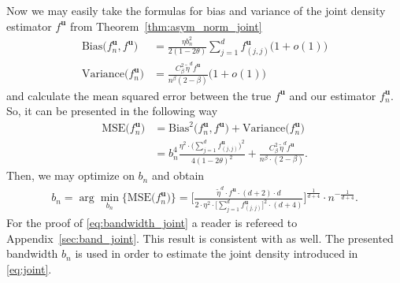 \documentclass[12pt]{article}
\begin{document}
	Now we may easily take the formulas for bias and variance of the joint density estimator $ f^{\mathbf{u}} $ from Theorem~\ref{thm:asym_norm_joint}
	\begin{align}
		\text{Bias}\big(f_n^{\mathbf{u}}, f^{\mathbf{u}}\big) &= \frac{\eta b_n^2}{2(1-2\theta)} \sum_{j=1}^{d}f^{\mathbf{u}}_{(j, j)}\big(1+o(1)\big) \\
		\text{Variance}\big(f_n^{\mathbf{u}}\big) &= \frac{C_\beta^2\, \widetilde{\eta}^df^{\mathbf{u}}}{n^\beta(2-\beta)} \big(1+o(1)\big)
	\end{align}
	and calculate the mean squared error between the true $ f^{\mathbf{u}} $ and our estimator $ f_n^{\mathbf{u}} $. So, it can be presented in the following way
	\begin{align}
		\text{MSE}\big(f_n^{\mathbf{u}}\big) &= \text{Bias}^2\big(f_n^{\mathbf{u}}, f^{\mathbf{u}}\big) + \text{Variance}\big(f_n^{\mathbf{u}}\big) \\
		&= b^4_n \frac{\eta^2\!\cdot \big(\!\sum_{j=1}^{d}f^{\mathbf{u}}_{(j, j)}\big)^2} {4(1-2\theta)^2} + \frac{C_\beta^2\, \widetilde{\eta}^df^{\mathbf{u}}}{n^\beta\!\cdot(2-\beta)}.
	\end{align}
	Then, we may optimize on $ b_n $ and obtain
	\begin{align}
		b_n = \arg \min_{b_n}\big\{\text{MSE}\big(f_n^{\mathbf{u}}\big)\big\} = \Bigg[\frac{\widetilde{\eta}^d\cdot f^{\mathbf{u}}\cdot(d+2)\cdot d}{2\cdot\eta^2\cdot\big[\sum_{j=1}^{d}f^{\mathbf{u}}_{(j, j)}\big]^2\cdot(d+4)}\Bigg]^{\frac{1}{d+4}} \cdot n^{-\frac{1}{d+4}}.\label{eq:bandwidth_joint}
	\end{align}
	For the proof of \eqref{eq:bandwidth_joint} a reader is refereed to Appendix~\ref{sec:band_joint}. This result is consistent with \textcite{Mokkadem2009} as well. The presented bandwidth $ b_n $ is used in order to estimate the joint density introduced in \eqref{eq:joint}.
	
	
\end{document}
